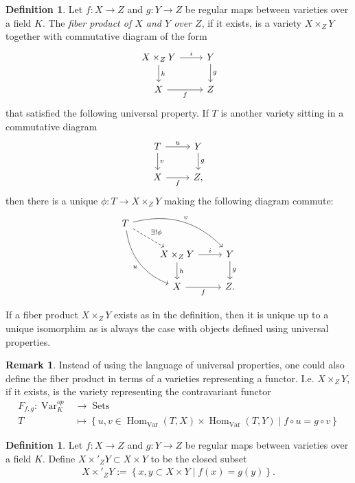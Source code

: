 \documentclass[a4paper,12pt,reqno]{amsart}
\newcommand{\set}[1]{\left\lbrace #1 \right\rbrace}
\DeclareMathOperator{\Var}{Var}
\DeclareMathOperator{\Sets}{Sets}
\DeclareMathOperator{\Hom}{Hom}
\theoremstyle{definition}
\newtheorem{definition}[lemma]{Definition}
\newtheorem{remark}[lemma]{Remark}
\numberwithin{lemma}{section}
\numberwithin{equation}{section}
\numberwithin{figure}{section}
\begin{document}
\begin{definition}
Let $f: X \to Z$ and $g : Y \to Z$ be regular maps between varieties over a field $K$. The \textit{fiber product of $X$ and $Y$ over $Z$}, if it exists, is a variety $X \times_Z Y$ together with commutative diagram of the form 
\[
\begin{tikzcd}
	X \times_Z Y \arrow[r,"i"] \arrow[d,"h"] & Y \arrow[d, "g"] \\
	X \arrow[r, "f"'] & Z
\end{tikzcd}
\]
 that satisfied the following universal property. If $T$ is another variety sitting in a commutative diagram
\[
\begin{tikzcd}
	T \arrow[r,"u"] \arrow[d,"v"] & Y \arrow[d, "g"] \\
	X \arrow[r, "f"'] & Z,
\end{tikzcd}
\]
then there is a unique $\phi : T \to X\times_Z Y$ making the following diagram commute:
\[
\begin{tikzcd}
T \arrow[ddr, bend right, "u"'] \arrow[drr, bend left, "v"] \arrow[dr, dashed, "\exists !\phi"] & & \\
& X \times_Z Y \arrow[r,"i"] \arrow[d,"h"] & Y \arrow[d, "g"] \\
& X \arrow[r, "f"'] & Z.
\end{tikzcd}
\]
\end{definition}\label{def:fiber_product_abstract}
If a fiber product $X\times_Z Y$ exists as in the definition, then it is unique up to a unique isomorphim as is always the case with objects defined using universal properties.

\begin{remark}Instead of using the language of universal properties, one could also define the fiber product in terms of a varieties representing a functor. I.e.  $X \times_Z Y$, if it exists, is the variety representing the contravariant functor
	\begin{align*}
	    F_{f,g} : \Var_K^{op} &\to \Sets \\
	         T &\mapsto \set{u,v \in \Hom_{\Var}(T,X) \times \Hom_{\Var}(T,Y)  \mid f\circ u = g \circ v}
	\end{align*}
\end{remark}


\begin{definition}\label{def:fiber_product_concrete}
Let $f: X \to Z$ and $g : Y \to Z$ be regular maps between varieties over a field $K$. Define $X\times'_Z Y \subset X \times Y$ to be the closed subset
\begin{align*}
X\times'_Z Y :=\set{x,y \subset X \times Y \mid f(x)=g(y)}.
\end{align*}
\end{definition}
\end{document}
